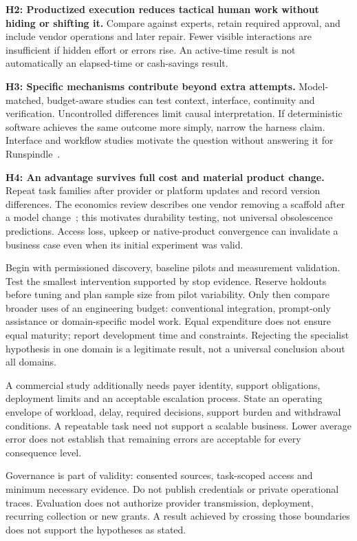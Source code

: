 \documentclass[11pt,letterpaper]{article}
\begin{document}
\textbf{H2: Productized execution reduces tactical human work without hiding or
shifting it.} Compare against experts, retain required approval, and include
vendor operations and later repair. Fewer visible interactions are insufficient
if hidden effort or errors rise. An active-time result is not automatically an
elapsed-time or cash-savings result.

\textbf{H3: Specific mechanisms contribute beyond extra attempts.} Model-matched,
budget-aware studies can test context, interface, continuity and verification.
Uncontrolled differences limit causal interpretation. If deterministic software
achieves the same outcome more simply, narrow the harness claim. Interface and
workflow studies motivate the question without answering it for
Runspindle~\cite{sweagent,anthropiceffective}.

\textbf{H4: An advantage survives full cost and material product change.} Repeat
task families after provider or platform updates and record version differences.
The economics review describes one vendor removing a scaffold after a model
change~\cite{anthropic2026}; this motivates durability testing, not universal
obsolescence predictions. Access loss, upkeep or native-product convergence can
invalidate a business case even when its initial experiment was valid.

Begin with permissioned discovery, baseline pilots and measurement validation.
Test the smallest intervention supported by stop evidence. Reserve holdouts before
tuning and plan sample size from pilot variability. Only then compare broader
uses of an engineering budget: conventional integration, prompt-only assistance
or domain-specific model work. Equal expenditure does not ensure equal maturity;
report development time and constraints. Rejecting the specialist hypothesis in
one domain is a legitimate result, not a universal conclusion about all domains.

A commercial study additionally needs payer identity, support obligations,
deployment limits and an acceptable escalation process. State an operating
envelope of workload, delay, required decisions, support burden and withdrawal
conditions. A repeatable task need not support a scalable business. Lower average
error does not establish that remaining errors are acceptable for every
consequence level.

Governance is part of validity: consented sources, task-scoped access and minimum
necessary evidence. Do not publish credentials or private operational traces.
Evaluation does not authorize provider transmission, deployment, recurring
collection or new grants. A result achieved by crossing those boundaries does not
support the hypotheses as stated.
\end{document}
